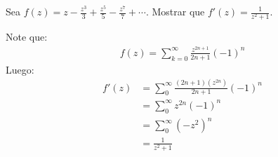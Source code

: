 \begin{homeworkProblem}
  Sea $f(z)=z-\frac{z^3}{3}+\frac{z^5}{5}-\frac{z^7}{7}+\cdots$. Mostrar que $f'(z)=\frac{1}{z^2+1}$.
  \begin{solution}
    Note que:
    \begin{align*}
      f(z) = \sum_{k=0}^{\infty} \frac{z^{2n+1}}{2n+1}(-1)^n      
    \end{align*}
    Luego:
    \begin{align*}
      f'(z) &= \sum_{0}^{\infty} \frac{(2n+1)(z^{2n})}{2n+1}(-1)^n\\
      &= \sum_{0}^{\infty}z^{2n}(-1)^n\\
      &= \sum_{0}^{\infty} (-z^2)^n\\
      &= \frac{1}{z^2 + 1}
    \end{align*}
  \end{solution}
\end{homeworkProblem}
